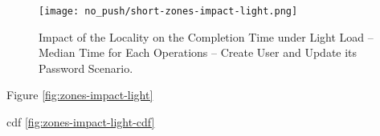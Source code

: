 \begin{figure}[H]
  \vspace{-10pt}
  \centering
  \centerline{\texttt{[image: no\_push/short-zones-impact-light.png]}}
  \vspace{-5pt}
  \caption{Impact of the Locality on the Completion Time under Light Load – Median Time for Each Operations – Create User and Update its Password Scenario.}
  \vspace{-5pt}
  \label{fig:short-zones-impact-light}
\end{figure}


Figure \ref{fig:zones-impact-light}

cdf \ref{fig:zones-impact-light-cdf}
